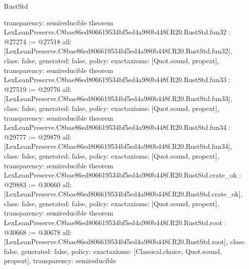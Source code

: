 \begin{lexlean}{RustStd}
\begin{coremodule}
{  transparency: semireducible
}
theorem LexLeanPreserve.C8bae86ed806619534bf5ed4a980b448f.R20.RustStd.fun32 : @27274 := @27518 {
  all: [LexLeanPreserve.C8bae86ed806619534bf5ed4a980b448f.R20.RustStd.fun32],
  class: false,
  generated: false,
  policy: exact{axioms: [Quot.sound, propext]},
  transparency: semireducible
}
theorem LexLeanPreserve.C8bae86ed806619534bf5ed4a980b448f.R20.RustStd.fun33 : @27519 := @29776 {
  all: [LexLeanPreserve.C8bae86ed806619534bf5ed4a980b448f.R20.RustStd.fun33],
  class: false,
  generated: false,
  policy: exact{axioms: [Quot.sound, propext]},
  transparency: semireducible
}
theorem LexLeanPreserve.C8bae86ed806619534bf5ed4a980b448f.R20.RustStd.fun34 : @29777 := @29879 {
  all: [LexLeanPreserve.C8bae86ed806619534bf5ed4a980b448f.R20.RustStd.fun34],
  class: false,
  generated: false,
  policy: exact{axioms: [Quot.sound, propext]},
  transparency: semireducible
}
theorem LexLeanPreserve.C8bae86ed806619534bf5ed4a980b448f.R20.RustStd.crate_ok : @29883 := @30660 {
  all: [LexLeanPreserve.C8bae86ed806619534bf5ed4a980b448f.R20.RustStd.crate_ok],
  class: false,
  generated: false,
  policy: exact{axioms: [Quot.sound, propext]},
  transparency: semireducible
}
theorem LexLeanPreserve.C8bae86ed806619534bf5ed4a980b448f.R20.RustStd.root : @30668 := @30678 {
  all: [LexLeanPreserve.C8bae86ed806619534bf5ed4a980b448f.R20.RustStd.root],
  class: false,
  generated: false,
  policy: exact{axioms: [Classical.choice, Quot.sound, propext]},
  transparency: semireducible
}


\end{coremodule}
\end{lexlean}
